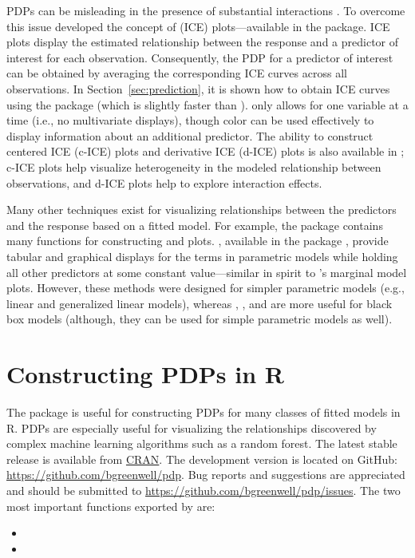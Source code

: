 PDPs can be misleading in the presence of substantial interactions \citep{goldstein-peeking-2015}. To overcome this issue \citeauthor*{goldstein-peeking-2015} developed the concept of  (ICE) plots---available in the  package. ICE plots display the estimated relationship between the response and a predictor of interest for each observation. Consequently, the PDP for a predictor of interest can be obtained by averaging the corresponding ICE curves across all observations. In Section~\ref{sec:prediction}, it is shown how to obtain ICE curves using the  package (which is slightly faster than ).  only allows for one variable at a time (i.e., no multivariate displays), though color can be used effectively to display information about an additional predictor. The ability to construct centered ICE (c-ICE) plots and derivative ICE (d-ICE) plots is also available in ; c-ICE plots help visualize heterogeneity in the modeled relationship between observations, and d-ICE plots help to explore interaction effects.

Many other techniques exist for visualizing relationships between the predictors and the response based on a fitted model. For example, the  package \citep{fox-car-2011} contains many functions for constructing  and  plots. , available in the  package \citep{fox-effects-2003}, provide tabular and graphical displays for the terms in parametric models while holding all other predictors at some constant value---similar in spirit to 's marginal model plots. However, these methods were designed for simpler parametric models (e.g., linear and generalized linear models), whereas , , and  are more useful for black box models (although, they can be used for simple parametric models as well).


\section{Constructing PDPs in R}
\label{sec:boston}

The  package is useful for constructing PDPs for many classes of fitted models in R. PDPs are especially useful for visualizing the relationships discovered by complex machine learning algorithms such as a random forest. The latest stable release is available from \href{https://cran.r-project.org/package=pdp}{CRAN}. The development version is located on GitHub: \url{https://github.com/bgreenwell/pdp}. Bug reports and suggestions are appreciated and should be submitted to \url{https://github.com/bgreenwell/pdp/issues}. The two most important functions exported by  are:
\begin{itemize}
  \item {}
  \item {}
\end{itemize}

